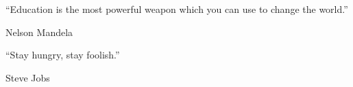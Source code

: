 \chapter*{}
\vfill
\hspace{50mm}

\begin{flushright}
	\begin{minipage}{50 mm}
	
	\itshape

	``Education is the most powerful weapon which you can use to change the world.'' 

	\vspace{5mm} 

	\normalfont

	Nelson Mandela
	
	\end{minipage}
\end{flushright}

\begin{flushright}
	\begin{minipage}{50 mm}
	\vspace{5mm} 
	\vspace{5mm} 
	
	\itshape

	``Stay hungry, stay foolish.'' 

	\vspace{5mm} 

	\normalfont

	Steve Jobs
	
	\end{minipage}
\end{flushright}



\thispagestyle{empty}